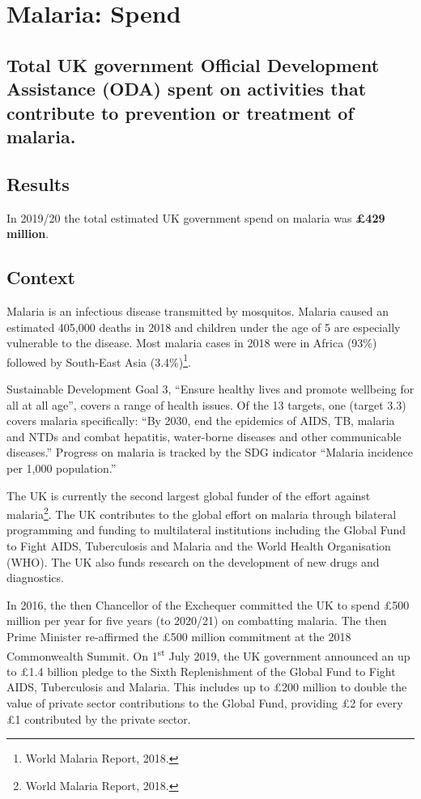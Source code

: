 \chapter{Malaria: Spend}

\section*{Total UK government Official Development Assistance (ODA) spent on activities that contribute to prevention or treatment of malaria.} %

\thispagestyle{empty}

\section{Results}

In 2019/20 the total estimated UK government spend on malaria was \textbf{\pounds 429 million}. %

\section{Context}

Malaria is an infectious disease transmitted by mosquitos. %
Malaria caused an estimated 405,000 deaths in 2018 and children under the age of 5 are especially vulnerable to the disease. Most malaria cases in 2018 were in Africa (93\%) followed by South-East Asia (3.4\%)\footnote{World Malaria Report, 2018.}. %

Sustainable Development Goal 3, ``Ensure healthy lives and promote wellbeing for all at all age'', covers a range of health issues. %
Of the 13 targets, one (target 3.3) covers malaria specifically: ``By 2030, end the epidemics of AIDS, TB, malaria and NTDs and combat hepatitis, water-borne diseases and other communicable diseases.'' %
Progress on malaria is tracked by the SDG indicator ``Malaria incidence per 1,000 population.'' %

The UK is currently the second largest global funder of the effort against malaria\footnote{World Malaria Report, 2018.}. %
The UK contributes to the global effort on malaria through bilateral programming and funding to multilateral institutions including the Global Fund to Fight AIDS, Tuberculosis and Malaria and the World Health Organisation (WHO). %
The UK also funds research on the development of new drugs and diagnostics. %

In 2016, the then Chancellor of the Exchequer committed the UK to spend \pounds 500 million per year for five years (to 2020/21) on combatting malaria. %
The then Prime Minister re-affirmed the \pounds 500 million commitment at the 2018 Commonwealth Summit. %
On 1\textsuperscript{st} July 2019, the UK government announced an up to \pounds 1.4 billion pledge to the Sixth Replenishment of the Global Fund to Fight AIDS, Tuberculosis and Malaria. %
This includes up to \pounds 200 million to double the value of private sector contributions to the Global Fund, providing \pounds 2 for every \pounds 1 contributed by the private sector. %

